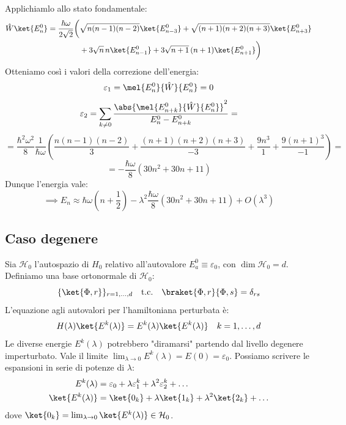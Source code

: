 Applichiamlo allo stato fondamentale:
\[
\begin{split}
    \hat{W}\ket{E_n^0} = \frac{\hbar \omega}{2\sqrt{2}} \bigg( &\sqrt{n(n-1)(n-2)} \ket{E_{n-3}^0} + \sqrt{(n+1)(n+2)(n+3)} \ket{E_{n+3}^0} \\
    &+ 3 \sqrt{n} \, n \ket{E_{n-1}^0} + 3 \sqrt{n+1} \, (n+1) \ket{E_{n+1}^0} \bigg)
\end{split}
\]
Otteniamo così i valori della correzione dell'energia:
\[
    \varepsilon_1 = \mel{E_n^0}{\hat{W}}{E_n^0} = 0 
\]
\[
    \varepsilon_2 = \sum_{k \neq 0} \frac{\abs{\mel{E_{n+k}^0}{\hat{W}}{E_n^0}}^2}{E_n^0 - E_{n+k}^0}=
\]
\[
    = \frac{\hbar^2 \omega^2}{8} \frac{1}{\hbar \omega} \left( \frac{n(n-1)(n-2)}{3} + \frac{(n+1)(n+2)(n+3)}{-3} + \frac{9n^3}{1} + \frac{9(n+1)^3}{-1} \right)=
\]
\[
    = -\frac{\hbar \omega}{8} ( 30 n^2 + 30 n + 11 )
\]
Dunque l'energia vale:
\begin{equation}
    \implies E_n \approx \hbar \omega \left(n + \frac{1}{2}\right) - \lambda^2 \frac{\hbar \omega}{8} ( 30 n^2 + 30 n + 11 ) + O(\lambda^3)
\end{equation}

\subsection{Caso degenere}
Sia $\mathcal{H}_0$ l'autospazio di $H_0$ relativo all'autovalore $E_a^0 \equiv \varepsilon_0$, con $\dim \mathcal{H}_0 = d$.
Definiamo una base ortonormale di $\mathcal{H}_0$:
\begin{equation}
    \{ \ket{\Phi, r} \}_{r=1,\dots,d} \quad \text{t.c.} \quad \braket{\Phi,r}{\Phi,s} = \delta_{rs}
\end{equation}
L'equazione agli autovalori per l'hamiltoniana perturbata è:
\begin{equation}
    H(\lambda)\ket{E^k(\lambda)} = E^k(\lambda)\ket{E^k(\lambda)} \quad k=1,\dots,d
\end{equation}
Le diverse energie $E^k(\lambda)$ potrebbero "diramarsi" partendo dal livello degenere imperturbato.
Vale il limite $\lim_{\lambda \to 0} E^k(\lambda) = E(0) = \varepsilon_0$.
Possiamo scrivere le espansioni in serie di potenze di $\lambda$:
\[
\begin{aligned}
    E^k(\lambda) &= \varepsilon_0 + \lambda \varepsilon_1^k + \lambda^2 \varepsilon_2^k + \dots \\
    \ket{E^k(\lambda)} &= \ket{0_k} + \lambda \ket{1_k} + \lambda^2 \ket{2_k} + \dots
\end{aligned}
\]
dove $\ket{0_k} = \lim_{\lambda \to 0} \ket{E^k(\lambda)} \in \mathcal{H}_0$.

